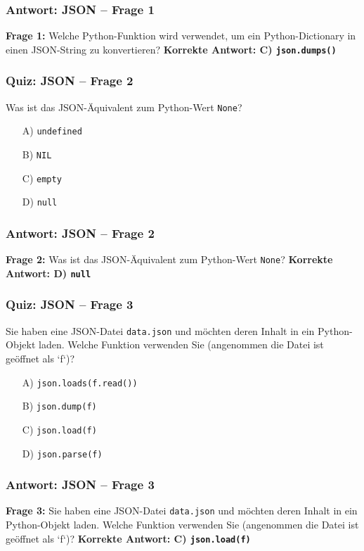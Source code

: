 \documentclass[aspectratio=169]{beamer} %
\begin{document}
\begin{frame}[fragile]
\frametitle{Antwort: JSON – Frage 1}
\textbf{Frage 1:} Welche Python-Funktion wird verwendet, um ein Python-Dictionary in einen JSON-String zu konvertieren?
\vspace{1em}
\textbf{Korrekte Antwort: C) \texttt{json.dumps()}}
\end{frame}

\begin{frame}[fragile]
\frametitle{Quiz: JSON – Frage 2}
Was ist das JSON-Äquivalent zum Python-Wert \texttt{None}?
\begin{enumerate}
    \item[A)] \texttt{undefined}
    \item[B)] \texttt{NIL}
    \item[C)] \texttt{empty}
    \item[D)] \texttt{null}
\end{enumerate}
\end{frame}

\begin{frame}[fragile]
\frametitle{Antwort: JSON – Frage 2}
\textbf{Frage 2:} Was ist das JSON-Äquivalent zum Python-Wert \texttt{None}?
\vspace{1em}
\textbf{Korrekte Antwort: D) \texttt{null}}
\end{frame}

\begin{frame}[fragile]
\frametitle{Quiz: JSON – Frage 3}
Sie haben eine JSON-Datei \texttt{data.json} und möchten deren Inhalt in ein Python-Objekt laden. Welche Funktion verwenden Sie (angenommen die Datei ist geöffnet als `f`)?
\begin{enumerate}
    \item[A)] \texttt{json.loads(f.read())}
    \item[B)] \texttt{json.dump(f)}
    \item[C)] \texttt{json.load(f)}
    \item[D)] \texttt{json.parse(f)}
\end{enumerate}
\end{frame}

\begin{frame}[fragile]
\frametitle{Antwort: JSON – Frage 3}
\textbf{Frage 3:} Sie haben eine JSON-Datei \texttt{data.json} und möchten deren Inhalt in ein Python-Objekt laden. Welche Funktion verwenden Sie (angenommen die Datei ist geöffnet als `f`)?
\vspace{1em}
\textbf{Korrekte Antwort: C) \texttt{json.load(f)}}
\end{frame}
\end{document}

